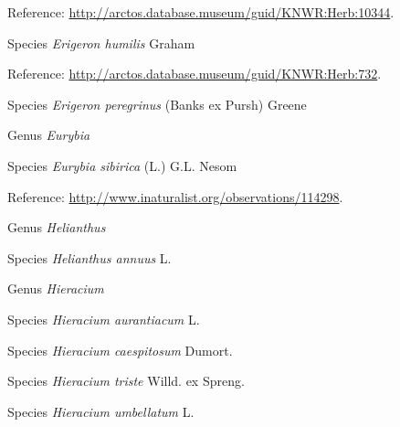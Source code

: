 \documentclass[9pt, article]{memoir}
\begin{document}
\begin{multicols}{2}
\vspace{6pt}Reference: 
\url{http://arctos.database.museum/guid/KNWR:Herb:10344}.

\vspace{6pt}\noindent\hspace{36pt}Species \textit{Erigeron humilis} Graham


\vspace{6pt}Reference: 
\url{http://arctos.database.museum/guid/KNWR:Herb:732}.

\vspace{6pt}\noindent\hspace{36pt}Species \textit{Erigeron peregrinus} (Banks ex Pursh) Greene


\vspace{6pt}\noindent\hspace{30pt}Genus \textit{Eurybia}


\vspace{6pt}\noindent\hspace{36pt}Species \textit{Eurybia sibirica} (L.) G.L. Nesom


\vspace{6pt}Reference: 
\url{http://www.inaturalist.org/observations/114298}.

\vspace{6pt}\noindent\hspace{30pt}Genus \textit{Helianthus}


\vspace{6pt}\noindent\hspace{36pt}Species \textit{Helianthus annuus} L.


\vspace{6pt}\noindent\hspace{30pt}Genus \textit{Hieracium}


\vspace{6pt}\noindent\hspace{36pt}Species \textit{Hieracium aurantiacum} L.


\vspace{6pt}\noindent\hspace{36pt}Species \textit{Hieracium caespitosum} Dumort.


\vspace{6pt}\noindent\hspace{36pt}Species \textit{Hieracium triste} Willd. ex Spreng.


\vspace{6pt}\noindent\hspace{36pt}Species \textit{Hieracium umbellatum} L.



\end{multicols}
\end{document}
